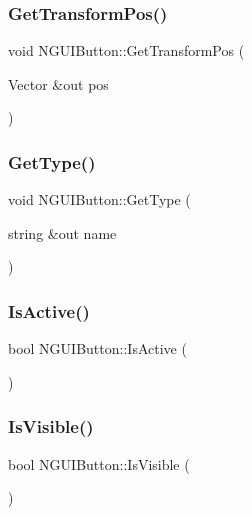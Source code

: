 \subsubsection{\texorpdfstring{Get\+Transform\+Pos()}{GetTransformPos()}}
{\footnotesize\ttfamily void N\+G\+U\+I\+Button\+::\+Get\+Transform\+Pos (\begin{DoxyParamCaption}\item[{Vector \&out}]{pos }\end{DoxyParamCaption})}

\hypertarget{class_n_g_u_i_button_a37d304dbd735ed24846d5735ef9b5eed}{}\label{class_n_g_u_i_button_a37d304dbd735ed24846d5735ef9b5eed} 
\subsubsection{\texorpdfstring{Get\+Type()}{GetType()}}
{\footnotesize\ttfamily void N\+G\+U\+I\+Button\+::\+Get\+Type (\begin{DoxyParamCaption}\item[{string \&out}]{name }\end{DoxyParamCaption})}

\hypertarget{class_n_g_u_i_button_a9c6eaecb52db4ee60d7f6bd002e126f3}{}\label{class_n_g_u_i_button_a9c6eaecb52db4ee60d7f6bd002e126f3} 
\subsubsection{\texorpdfstring{Is\+Active()}{IsActive()}}
{\footnotesize\ttfamily bool N\+G\+U\+I\+Button\+::\+Is\+Active (\begin{DoxyParamCaption}{ }\end{DoxyParamCaption})}

\hypertarget{class_n_g_u_i_button_aeeccb1f0082a2b10949a4dc6ff534f9e}{}\label{class_n_g_u_i_button_aeeccb1f0082a2b10949a4dc6ff534f9e} 
\subsubsection{\texorpdfstring{Is\+Visible()}{IsVisible()}}
{\footnotesize\ttfamily bool N\+G\+U\+I\+Button\+::\+Is\+Visible (\begin{DoxyParamCaption}{ }\end{DoxyParamCaption})}

